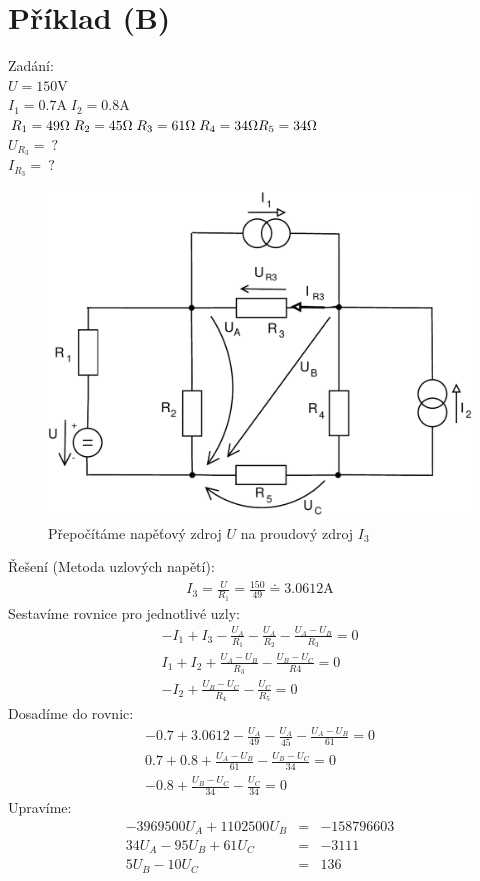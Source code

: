 \documentclass[12pt,a4paper]{article}
\begin{document}
\section{Příklad (B)}
\Large{Zadání:} \\
	$U = 150 \text{V}$ \\
	$I_1 = 0.7\text{A}\;I_2 = 0.8\text{A}$\\
	$R_1 = 49 \Omega \; R_2 = 45 \Omega \; R_3 = 61 \Omega \;
	R_4 = 34 \Omega \\ R_5 = 34 \Omega $\\
	$U_{R_3} = \: \text{?}$ \\
	$I_{R_3} = \: \text{?}$ \\
		\begin{figure}[H]
		\center\includegraphics[width=0.6\linewidth]{img9.pdf}
		\caption*{Přepočítáme napěťový zdroj $U$ na proudový zdroj $I_3$}
\end{figure}
{\Large Řešení (Metoda uzlových napětí):}\\
\begin{gather*}
	I_3 = \frac{U}{R_1}=\frac{150}{49}\doteq3.0612\text{A}
\end{gather*}
Sestavíme rovnice pro jednotlivé uzly:
\begin{eqnarray*}
-I_1+I_3-\frac{U_A}{R_1}-\frac{U_A}{R_2}-\frac{U_A-U_B}{R_3} = 0\\
I_1+I_2+\frac{U_A-U_B}{R_3}-\frac{U_B-U_C}{R4} = 0\\
-I_2+\frac{U_B-U_C}{R_4}-\frac{U_C}{R_5	}=0
\end{eqnarray*}
Dosadíme do rovnic:
\begin{eqnarray*}
-0.7+3.0612-\frac{U_A}{49}-\frac{U_A}{45}-\frac{U_A-U_B}{61}=0\\
0.7+0.8+\frac{U_A-U_B}{61}-\frac{U_B-U_C}{34} = 0\\
-0.8+\frac{U_B-U_C}{34}-\frac{U_C}{34}=0
\end{eqnarray*}
Upravíme:
\begin{eqnarray*}
-3969500U_A + 1102500U_B &=& -158796603\\
34U_A - 95U_B + 61U_C &=& -3111\\
5U_B-10U_C &=& 136
\end{eqnarray*}
\end{document}
